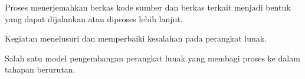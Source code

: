 

\begin{description}[style=multiline,leftmargin=35mm,font=\normalfont]
  \item[Compile] Proses menerjemahkan berkas kode sumber dan berkas terkait menjadi bentuk yang dapat dijalankan atau diproses lebih lanjut.
  \item[Debug] Kegiatan menelusuri dan memperbaiki kesalahan pada perangkat lunak.
  \item[Waterfall] Salah satu model pengembangan perangkat lunak yang membagi proses ke dalam tahapan berurutan.
\end{description}
